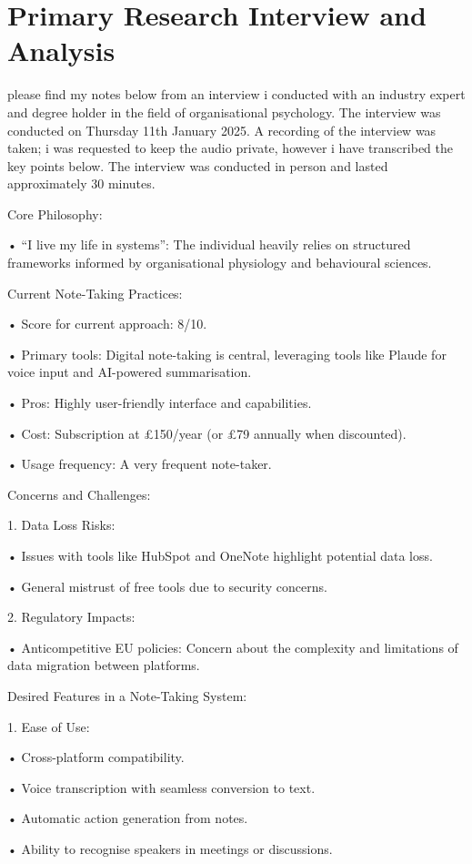 \section{Primary Research Interview and Analysis}
\label{research:PrimaryResearchInterviewAndAnalysis}
please find my notes below from an interview i conducted with an industry expert and degree holder in the field of organisational psychology. The interview was conducted on Thursday 11th January 2025. A recording of the interview was taken; i was requested to keep the audio private, however i have transcribed the key points below. The interview was conducted in person and lasted approximately 30 minutes.

Core Philosophy:

	•	“I live my life in systems”: The individual heavily relies on structured frameworks informed by organisational physiology and behavioural sciences.

Current Note-Taking Practices:

	•	Score for current approach: 8/10.

	•	Primary tools: Digital note-taking is central, leveraging tools like Plaude for voice input and AI-powered summarisation.
	
	•	Pros: Highly user-friendly interface and capabilities.

	•	Cost: Subscription at £150/year (or £79 annually when discounted).
	
	•	Usage frequency: A very frequent note-taker.

Concerns and Challenges:

	1.	Data Loss Risks:

	•	Issues with tools like HubSpot and OneNote highlight potential data loss.

	•	General mistrust of free tools due to security concerns.

	2.	Regulatory Impacts:

	•	Anticompetitive EU policies: Concern about the complexity and limitations of data migration between platforms.

Desired Features in a Note-Taking System:

	1.	Ease of Use:

	•	Cross-platform compatibility.

	•	Voice transcription with seamless conversion to text.

	•	Automatic action generation from notes.

	•	Ability to recognise speakers in meetings or discussions.

